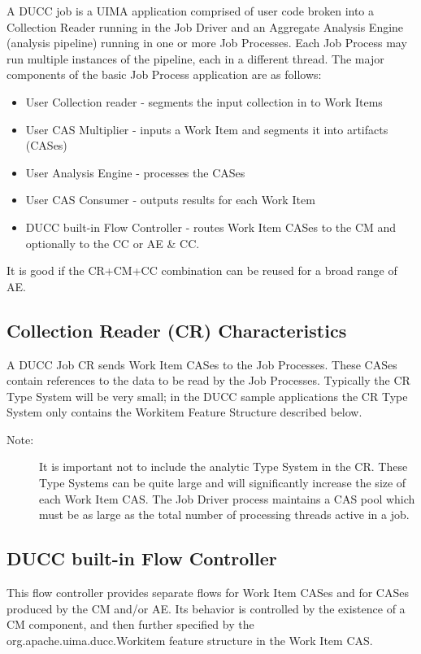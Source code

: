 A DUCC job is a UIMA application comprised of user code broken into a Collection
Reader running in the Job Driver and an Aggregate Analysis Engine (analysis pipeline) running in one 
or more Job Processes. Each Job Process may run multiple instances of the pipeline, each in a different
thread. The major components of the basic Job Process application are as follows:

\begin{itemize}
  \item User Collection reader - segments the input collection in to Work Items
  \item User CAS Multiplier - inputs a Work Item and segments it into artifacts (CASes)
  \item User Analysis Engine - processes the CASes
  \item User CAS Consumer - outputs results for each Work Item
  \item DUCC built-in Flow Controller - routes Work Item CASes to the CM and optionally to the CC or AE \& CC.
\end{itemize}

It is good if the CR+CM+CC combination can be reused for a broad range of AE.

\subsection{Collection Reader (CR) Characteristics}
A DUCC Job CR sends Work Item CASes to the Job Processes. These CASes contain references to the data
to be read by the Job Processes. Typically the CR Type System will be very small; in the DUCC sample
applications the CR Type System only contains the Workitem Feature Structure described below.

\begin{description}
    \item[Note:] It is important not to include the analytic Type System in the CR. These Type Systems 
can be quite large and will significantly increase the size of each Work Item CAS. 
The Job Driver process maintains a CAS pool which must be as large
as the total number of processing threads active in a job. 
\end{description}

\subsection{DUCC built-in Flow Controller}
\begin{sloppypar}
This flow controller provides separate flows for Work Item CASes and for CASes produced by the CM and/or AE.
Its behavior is controlled by the existence of a CM component, and then further specified by the
org.apache.uima.ducc.Workitem feature structure in the Work Item CAS.
\end{sloppypar}

